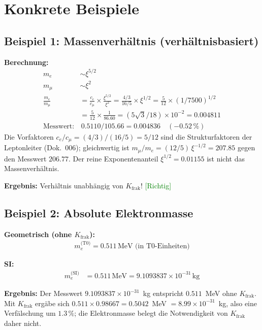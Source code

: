 	\section{Konkrete Beispiele}
	
	\subsection{Beispiel 1: Massenverhältnis (verhältnisbasiert)}
	
	\textbf{Berechnung:}
	\begin{align*}
		m_e &\sim \xi^{5/2} \\
		m_μ &\sim \xi^2 \\
		\frac{m_e}{m_μ} &= \frac{c_e}{c_μ} \times \frac{\xi^{5/2}}{\xi^2} = \frac{4/3}{16/5} \times \xi^{1/2} = \frac{5}{12} \times (1/7500)^{1/2} \\
		&= \frac{5}{12} \times \frac{1}{86.60} = (5\sqrt{3}/18) \times 10^{-2} = 0.004811 \\
		\text{Messwert:} &\, 0.5110/105.66 = 0.004836 \quad (-0.52\,\%)
	\end{align*}
	Die Vorfaktoren $c_e/c_μ = (4/3)/(16/5) = 5/12$ sind die Strukturfaktoren der Leptonleiter (Dok.~006); gleichwertig ist $m_μ/m_e = (12/5)\,\xi^{-1/2} = 207.85$ gegen den Messwert $206.77$. Der reine Exponentenanteil $\xi^{1/2} = 0.01155$ ist nicht das Massenverhältnis.
	
	\textbf{Ergebnis:} Verhältnis unabhängig von $K_{\text{frak}}$! \textcolor{green}{[Richtig]}
	
	\subsection{Beispiel 2: Absolute Elektronmasse}
	
	\textbf{Geometrisch (ohne $K_{\text{frak}}$):}
	\begin{align*}
		m_e^{\text{(T0)}} = 0.511\,\text{MeV (in T0-Einheiten)}
	\end{align*}
	
	\textbf{SI:}
	\begin{align*}
		m_e^{\text{(SI)}} &= 0.511\,\text{MeV} = 9.1093837 \times 10^{-31}\,\text{kg}
	\end{align*}
	
	\textbf{Ergebnis:} Der Messwert $9.1093837\times10^{-31}$~kg entspricht $0.511$~MeV ohne $K_{\text{frak}}$. Mit $K_{\text{frak}}$ ergäbe sich $0.511 \times 0.98667 = 0.5042$~MeV $= 8.99\times10^{-31}$~kg, also eine Verfälschung um $1.3\,\%$; die Elektronmasse belegt die Notwendigkeit von $K_{\text{frak}}$ daher nicht.
	
